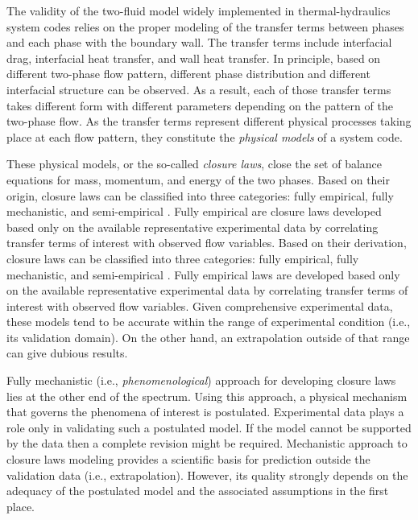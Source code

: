 The validity of the two-fluid model widely implemented in thermal-hydraulics system codes relies on the proper modeling of the transfer terms between phases and each phase with the boundary wall.
The transfer terms include interfacial drag, interfacial heat transfer, and wall heat transfer.
In principle, based on different two-phase flow pattern, different phase distribution and different interfacial structure can be observed.
As a result, each of those transfer terms takes different form with different parameters depending on the pattern of the two-phase flow.
As the transfer terms represent different physical processes taking place at each flow pattern, they constitute the \emph{physical models} of a system code.

These physical models, or the so-called \emph{closure laws}, close the set of balance equations for mass, momentum, and energy of the two phases.
Based on their origin, closure laws can be classified into three categories: fully empirical, fully mechanistic, and semi-empirical \cite{Bestion2008}.
Fully empirical are closure laws developed based only on the available representative experimental data by correlating transfer terms of interest with observed flow variables.
Based on their derivation, closure laws can be classified into three categories: fully empirical, fully mechanistic, and semi-empirical \cite{Bestion2008}.
Fully empirical laws are developed based only on the available representative experimental data by correlating transfer terms of interest with observed flow variables.
Given comprehensive experimental data, these models tend to be accurate within the range of experimental condition (i.e., its validation domain).
On the other hand, an extrapolation outside of that range can give dubious results.

Fully mechanistic (i.e., \emph{phenomenological}) approach for developing closure laws lies at the other end of the spectrum.
Using this approach, a physical mechanism that governs the phenomena of interest is postulated.
Experimental data plays a role only in validating such a postulated model.
If the model cannot be supported by the data then a complete revision might be required.
Mechanistic approach to closure laws modeling provides a scientific basis for prediction outside the validation data (i.e., extrapolation). 
However, its quality strongly depends on the adequacy of the postulated model and the associated assumptions in the first place.

